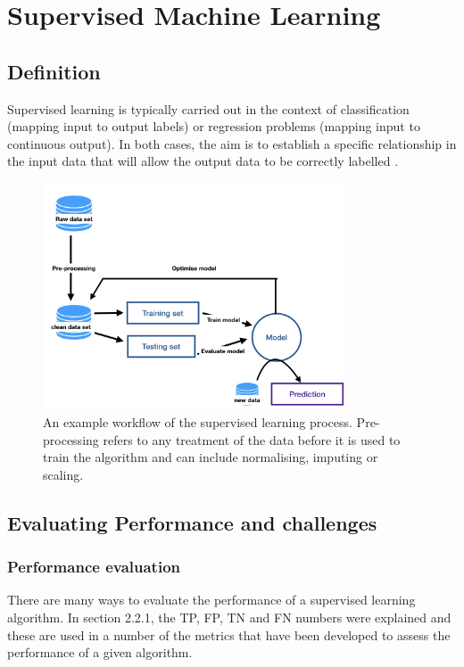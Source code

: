 \section{Supervised Machine Learning}
\subsection{Definition}
Supervised learning is typically carried out in the context of classification (mapping input to output labels) or regression problems (mapping input to continuous output). In both cases, the aim is to establish a specific relationship in the input data that will allow the output data to be correctly labelled \citep{Soni:tr}. 

\begin{figure}[H]
    \centering
    \includegraphics[width=0.8\textwidth]{ThesisTemplate/usingLatex/images/supervisedLearning.png}
    \caption{An example workflow of the supervised learning process. Pre-processing refers to any treatment of the data before it is used to train the algorithm and can include normalising, imputing or scaling.}
    \label{fig:supervisedLearning}
\end{figure}


\subsection{Evaluating Performance and challenges}

\subsubsection{Performance evaluation}
There are many ways to evaluate the performance of a supervised learning algorithm. In section 2.2.1, the TP, FP, TN and FN numbers were explained and these are used in a number of the metrics that have been developed to assess the performance of a given algorithm.

